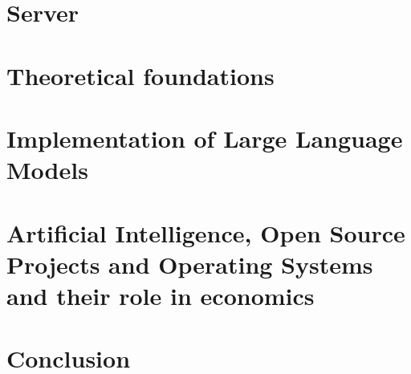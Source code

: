 \part{Server}



\part{Theoretical foundations} %
%


%

\part{Implementation of Large Language Models}





%
%


\part{Artificial Intelligence, Open Source Projects and Operating Systems and their role in economics}

 


\part{Conclusion}
%





\appendix                       %







\listoffigures
\lstlistoflistings
\nocite{*}



